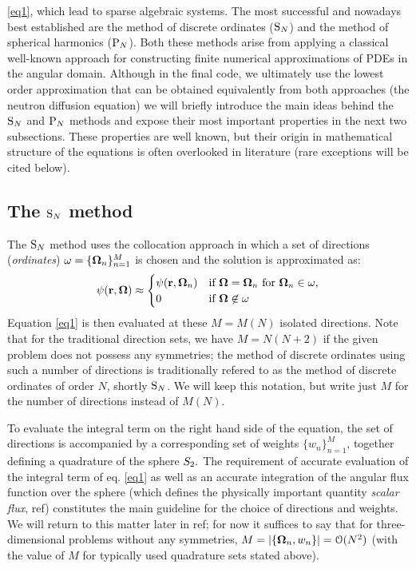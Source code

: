 \eqref{eq1}, which lead to sparse algebraic systems. The most successful and nowadays best established are the method
of discrete ordinates ($\text{S}_{N}$) and the method of spherical harmonics ($\text{P}_{N}$).
Both these methods arise from applying a classical well-known approach for constructing finite numerical
approximations of PDEs  in the
angular domain. Although in the final code, we ultimately use the lowest order approximation that can be obtained
equivalently from both approaches (the neutron diffusion equation) we will briefly introduce the main ideas behind the
$\text{S}_{N}$ and $\text{P}_{N}$ methods and expose their most important properties in the next two subsections. These properties are
well known, but their origin in mathematical structure of the equations is often overlooked in literature (rare
exceptions will be cited below). 

\subsection{The $\text{S}_{N}$ method}\label{sec:1-SN}
The $\text{S}_{N}$ method uses the collocation approach in which a set of directions (\textit{ordinates})
$\omega = \{\mathbf{\Omega}_n\}_{n=1}^{M}$ is chosen and the solution is approximated as:
\begin{equation}\label{eq:sn_approx} 
	\psi(\mathbf{r}, \mathbf{\Omega}) \approx 
		\begin{cases}\displaystyle \psi(\mathbf{r},\mathbf{\Omega}_n) & \mbox{if $\mathbf{\Omega} = \mathbf{\Omega}_n$ for $\mathbf{\Omega}_n \in \omega$},\\ 0 & \mbox{if $\mathbf{\Omega} \not \in \omega$} \end{cases} 
\end{equation}
Equation \eqref{eq1} is then evaluated at these $M = M(N)$ isolated directions.
Note that for the traditional direction sets, we have $M = N(N+2)$ if the given problem does not possess any symmetries; the
method of discrete ordinates using such a number of directions is traditionally refered to as the method of discrete
ordinates of order $N$, shortly $\text{S}_{N}$. We will keep this notation, but  write just $M$ for the number of directions
instead of $M(N)$.

To evaluate the integral term on the right hand side of the equation, the set of directions is accompanied by a
corresponding set of weights $\{w_n\}_{n=1}^{M}$, together defining a quadrature of the sphere $S_2.$ The
requirement of accurate evaluation of the integral term of eq.
\eqref{eq1} as well as an accurate integration of the angular flux function over the sphere (which defines the
physically important quantity \textit{scalar flux}, \alert{ref}) constitutes the main guideline for the choice of
directions and weights. We will return to this matter later in \alert{ref}; for now it suffices to say that for
three-dimensional problems without any symmetries, \mbox{$M = \left|\{\mathbf{\Omega}_n, w_n\}\right| = \mathcal{O}(N^2)$} (with the
value of $M$ for typically used quadrature sets stated above).

